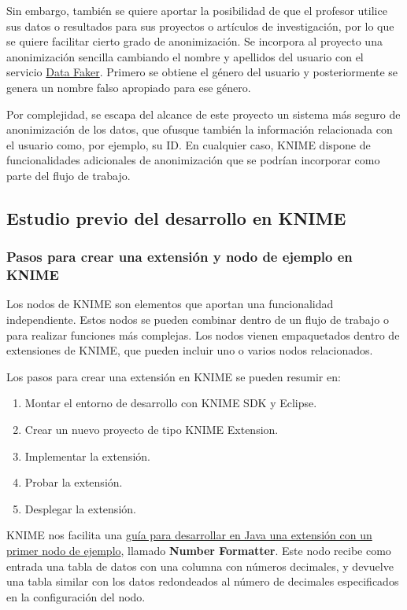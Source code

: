 Sin embargo, también se quiere aportar la posibilidad de que el profesor utilice sus datos o resultados para sus 
proyectos o artículos de investigación, por lo que se quiere facilitar cierto grado de anonimización. Se incorpora al proyecto
una anonimización sencilla cambiando el nombre y apellidos del usuario con el servicio \href{https://www.datafaker.net/}{Data Faker}. Primero se obtiene el 
género del usuario y posteriormente se genera un nombre falso apropiado para ese género. 
\

Por complejidad, se escapa del alcance de este proyecto un sistema más seguro de anonimización de los datos, que ofusque 
también la información relacionada con el usuario como, por ejemplo, su ID. En cualquier caso, KNIME dispone de funcionalidades
adicionales de anonimización que se podrían incorporar como parte del flujo de trabajo. 


\subsection{Estudio previo del desarrollo en KNIME}

\subsubsection{Pasos para crear una extensión y nodo de ejemplo en KNIME}

Los nodos de KNIME son elementos que aportan una funcionalidad independiente. Estos nodos se pueden combinar dentro de un 
flujo de trabajo o  para realizar funciones más complejas. Los nodos vienen empaquetados dentro de extensiones de KNIME, que 
pueden incluir uno o varios nodos relacionados. 
\

Los pasos para crear una extensión en KNIME se pueden resumir en: 

\begin{enumerate}
	\item Montar el entorno de desarrollo con KNIME SDK y Eclipse.
	\item Crear un nuevo proyecto de tipo KNIME Extension. 
	\item Implementar la extensión. 
	\item Probar la extensión. 
	\item Desplegar la extensión. 
\end{enumerate}

KNIME nos facilita una \href{https://docs.knime.com/latest/analytics_platform_new_node_quickstart_guide/index.html\#_introduction}{guía 
para desarrollar en Java una extensión con un primer nodo de ejemplo}, llamado \textbf{Number Formatter}. Este nodo recibe como entrada 
una tabla de datos con una columna con números decimales, y devuelve una tabla similar con los datos redondeados al número 
de decimales especificados en la configuración del nodo. 
\

